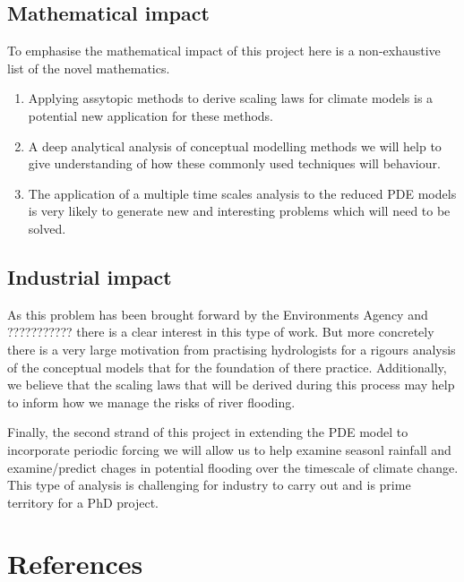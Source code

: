 \documentclass[11pt]{article}
\begin{document}
\subsection{Mathematical impact}
To emphasise the mathematical impact of this project here is a non-exhaustive list of the novel mathematics. 
\begin{enumerate}
    \item Applying assytopic methods to derive scaling laws for climate models is a potential new application for these methods.
    \item A deep analytical analysis of conceptual modelling methods we will help to give understanding of how these commonly used techniques will behaviour.
    \item The application of a multiple time scales analysis to the reduced PDE models is very likely to generate new and interesting problems which will need to be solved.
\end{enumerate}

\subsection{Industrial impact}
As this problem has been brought forward by the Environments Agency and ??????????? there is a clear interest in this type of work. But more concretely there is a very large motivation from practising hydrologists for a rigours analysis of the conceptual models that for the foundation of there practice. Additionally, we believe that the scaling laws that will be derived during this process may help to inform how we manage the risks of river flooding.

Finally, the second strand of this project in extending the PDE model to incorporate periodic forcing we will allow us to help examine seasonl rainfall and examine/predict chages in potential flooding over the timescale of climate change. This type of analysis is challenging for industry to carry out and is prime territory for a PhD project.




\section{References}
\end{document}
